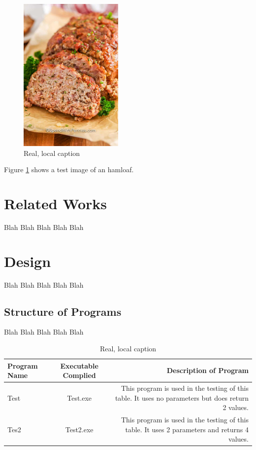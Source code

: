 \documentclass{article}
\begin{document}
    \begin{figure}[H]
        \centering
        \includegraphics[height=3in]{./media/hamloaf.jpeg}
        \caption[Optional caption]{Real, local caption}
        \label{fig:test}
    \end{figure}

    Figure \ref{fig:test} shows a test image of an hamloaf.

    \section{Related Works}\label{sec:relworks}
    Blah Blah Blah Blah Blah

    \section{Design}\label{sec:design}
    Blah Blah Blah Blah Blah

    \subsection{Structure of Programs}\label{subsec:programstructs}
    Blah Blah Blah Blah Blah

    \begin{table}[H]
        \centering
        \caption[Optional Caption]{Real, local caption}
        \label{tab:progsdef}
        \begin{tabulary}{\linewidth}{LCR}
            \hline
            Program Name & Executable Complied & Description of Program \\ 
            \hline
            Test & Test.exe & This program is used in the testing of this table. It uses no parameters but does return 2 values. \\
            Tes2 & Test2.exe & This program is used in the testing of this table. It uses 2 parameters and returns 4 values. \\
        \end{tabulary}
    \end{table}
    
\end{document}
